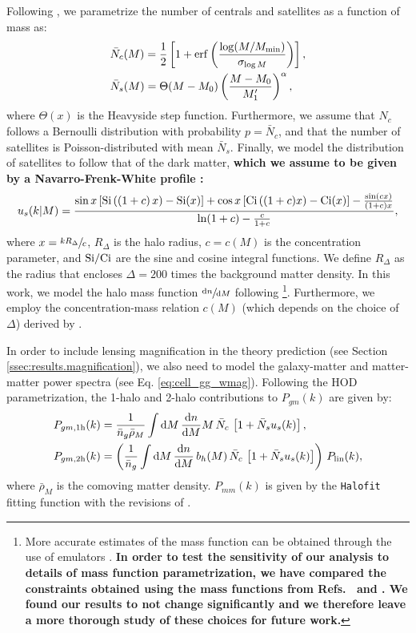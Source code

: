 \documentclass[a4paper,11pt]{article}
\newcommand{\rev}[1]{{\textbf{#1}}}
\begin{document}
    Following \cite{2011ApJ...736...59Z}, we parametrize the number of centrals and satellites as a function of mass as:
    \begin{align}
      &\bar{N}_c(M)=\frac{1}{2}\left[1+{\rm erf}\left(\frac{\log(M/M_{\rm min})}{\sigma_{\log M}}\right)\right],\\
      &\bar{N}_s(M)=\Theta(M-M_0)\left(\frac{M-M_0}{M_1'}\right)^\alpha,
    \end{align}
    where $\Theta(x)$ is the Heavyside step function. Furthermore, we assume that $N_c$ follows a Bernoulli distribution with probability $p=\bar{N}_c$, and that the number of satellites is Poisson-distributed with mean $\bar{N}_s$. Finally, we model the distribution of satellites to follow that of the dark matter, \rev{which we assume to be given by a Navarro-Frenk-White profile \cite{Navarro:1996}:}
    \begin{equation}
      u_s(k|M)=\frac{\sin x\left[{\rm Si}\left((1+c)\,x\right)-{\rm Si}(x)\right]+\cos x\left[{\rm Ci}\left((1+c)x\right)-{\rm Ci}(x)\right]-\frac{\sin(cx)}{(1+c)x}}{{\rm ln}(1+c)-\frac{c}{1+c}},
    \end{equation}
    where $x=\sfrac{k R_\Delta}{c}$, $R_\Delta$ is the halo radius, $c=c(M)$ is the concentration parameter, and ${\rm Si}/{\rm Ci}$ are the sine and cosine integral functions. We define $R_\Delta$ as the radius that encloses $\Delta=200$ times the background matter density. In this work, we model the halo mass function $\sfrac{\mathrm{d}n}{\mathrm{d}M}$ following \cite{Tinker:2010}\footnote{More accurate estimates of the mass function can be obtained through the use of emulators \citep{2019ApJ...872...53M}. \rev{In order to test the sensitivity of our analysis to details of mass function parametrization, we have compared the constraints obtained using the mass functions from Refs.~\cite{Tinker:2010} and \cite{Tinker:2008}. We found our results to not change significantly and we therefore leave a more thorough study of these choices for future work.}}. Furthermore, we employ the concentration-mass relation $c(M)$ (which depends on the choice of $\Delta$) derived by \cite{Duffy:2008}.

    In order to include lensing magnification in the theory prediction (see Section \ref{ssec:results.magnification}), we also need to model the galaxy-matter and matter-matter power spectra (see Eq. \ref{eq:cell_gg_wmag}). Following the HOD parametrization, the 1-halo and 2-halo contributions to $P_{gm}(k)$ are given by:
    \begin{align}
      & P_{gm,{\rm 1h}}(k)=\frac{1}{\bar{n}_g\bar{\rho}_M} \int \mathrm{d}M\,\frac{\mathrm{d}n}{\mathrm{d}M} M\,\bar{N}_c\,\left[1+\bar{N}_su_s(k)\right],\\
      & P_{gm,{\rm 2h}}(k)=\left(\frac{1}{\bar{n}_g} \int \mathrm{d}M\,\frac{\mathrm{d}n}{\mathrm{d}M}\,b_h(M)\,\bar{N}_c\,\left[1+\bar{N}_su_s(k)\right]\right)\,P_{\rm lin}(k),
    \end{align}
    where $\bar{\rho}_M$ is the comoving matter density. $P_{mm}(k)$ is given by the {\tt Halofit} fitting function \cite{Smith:2003} with the revisions of \cite{Takahashi:2012}.
\end{document}

